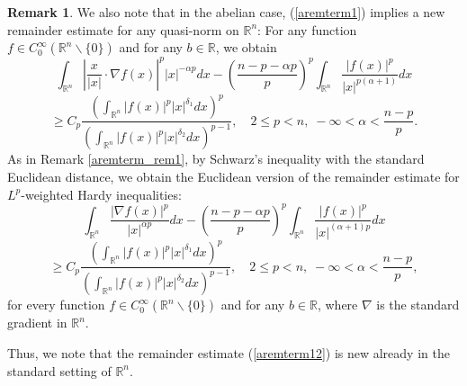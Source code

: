 \documentclass[a4paper,12pt,reqno]{amsart}
\renewcommand\eqref[1]{(\ref{#1})} %
\numberwithin{equation}{section}
\theoremstyle{plain}
\theoremstyle{definition}
\newtheorem{rem}[thm]{Remark}
\newcommand{\Rn}{\mathbb R^{n}}
\begin{document}
\begin{rem}\label{aremterm_rem2}
We also note that in the abelian case, \eqref{aremterm1} implies a new remainder estimate for any quasi-norm on $\Rn$: For any function $f\in C_{0}^{\infty}(\Rn\backslash\{0\})$ and for any $b\in\mathbb{R}$, we obtain
$$\int_{\Rn}\left|\frac{x}{|x|}\cdot\nabla f(x)\right|^{p}|x|^{-\alpha p}dx-\left(\frac{n-p-\alpha p}{p}\right)^{p}\int_{\Rn}\frac{|f(x)|^{p}}{|x|^{p(\alpha+1)}}dx$$
\begin{equation}\label{aremterm11}
\geq C_{p} \frac{\left(\int_{\Rn}|f(x)|^{p}|x|^{\delta_{1}}dx\right)^{p}}
{\left(\int_{\Rn}|f(x)|^{p}|x|^{\delta_{2}}dx\right)^{p-1}},\quad 2\leq p<n,\;-\infty<\alpha<\frac{n-p}{p}.
\end{equation}
As in Remark \ref{aremterm_rem1}, by Schwarz's inequality with the standard Euclidean distance, we obtain the Euclidean version of the remainder estimate for $L^{p}$-weighted Hardy inequalities:
$$\int_{\Rn}\frac{\left|\nabla f(x)\right|^{p}}{|x|^{\alpha p}}dx-\left(\frac{n-p-\alpha p}{p}\right)^{p}\int_{\Rn}\frac{|f(x)|^{p}}{|x|^{(\alpha+1)p}}dx$$
\begin{equation}\label{aremterm12}
\geq C_{p} \frac{\left(\int_{\Rn}|f(x)|^{p}|x|^{\delta_{1}}dx\right)^{p}}
{\left(\int_{\Rn}|f(x)|^{p}|x|^{\delta_{2}}dx\right)^{p-1}},\quad 2\leq p<n,\;-\infty<\alpha<\frac{n-p}{p},
\end{equation}
for every function $f\in C_{0}^{\infty}(\Rn\backslash\{0\})$ and for any $b\in\mathbb{R}$, where $\nabla$ is the standard gradient in $\Rn$.

Thus, we note that the remainder estimate \eqref{aremterm12} is new already in the standard setting of $\Rn$.
\end{rem}
\end{document}
